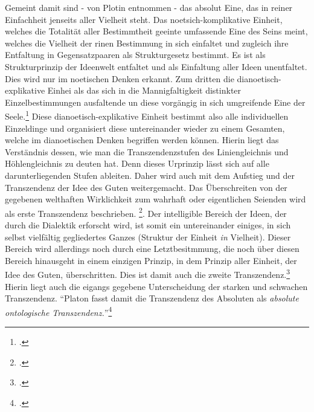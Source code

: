 Gemeint damit sind - von Plotin entnommen - das absolut Eine, das in reiner Einfachheit jenseits aller Vielheit steht. Das noetsich-komplikative Einheit, welches die Totalität aller Bestimmtheit geeinte umfassende Eine des Seins meint, welches die Vielheit der rinen Bestimmung in sich einfaltet und zugleich ihre Entfaltung in Gegensatzpaaren als Strukturgesetz bestimmt. Es ist als Strukturprinzip der Ideenwelt entfaltet und als Einfaltung aller Ideen unentfaltet. Dies wird nur im noetischen Denken erkannt. Zum dritten die dianoetisch-explikative Einhei als das sich in die Mannigfaltigkeit distinkter Einzelbestimmungen ausfaltende un diese vorgängig in sich umgreifende Eine der Seele.\footcite[vgl.][S. 190]{halfwassenaufstieg2006} Diese dianoetisch-explikative Einheit bestimmt also alle individuellen Einzeldinge und organisiert diese untereinander wieder zu einem Gesamten, welche im dianoetischen Denken begriffen werden können.
Hierin liegt das Verständnis dessen, wie man die Transzendenzstufen des Liniengleichnis und Höhlengleichnis zu deuten hat. Denn dieses Urprinzip lässt sich auf alle darunterliegenden Stufen ableiten.
Daher wird auch mit dem Aufstieg und der Transzendenz der Idee des Guten weitergemacht.
Das Überschreiten von der gegebenen welthaften Wirklichkeit zum wahrhaft oder eigentlichen Seienden wird als erste Transzendenz beschrieben. \footcite[vgl.][S. 222]{halfwassenaufstieg2006}.
Der intelligible Bereich der Ideen, der durch die Dialektik erforscht wird, ist somit ein untereinander einiges, in sich selbst vielfältig gegliedertes Ganzes (Struktur der Einheit \emph{in} Vielheit). Dieser Bereich wird allerdings noch durch eine Letztbesitmmung, die noch über diesen Bereich hinausgeht in einem einzigen Prinzip, in dem Prinzip aller Einheit, der Idee des Guten, überschritten. Dies ist damit auch die zweite Transzendenz.\footcite[vgl.][S. 223f.]{halfwassenaufstieg2006}
Hierin liegt auch die eigangs gegebene Unterscheidung der starken und schwachen Transzendenz.
\enquote{Platon fasst damit die Transzendenz des Absoluten als \emph{absolute ontologische Transzendenz.}}\footcite[][S. 224]{halfwassenaufstieg2006}

